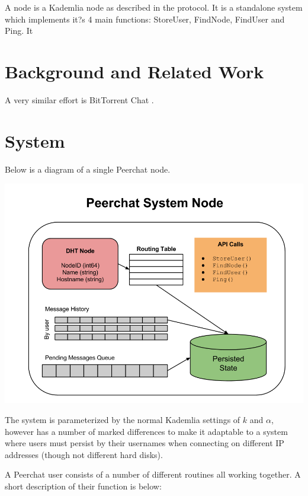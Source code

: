 \documentclass{article}
\begin{document}
A node is a Kademlia node as described in the protocol. It is a standalone system which implements it?s 4 main functions: StoreUser, FindNode, FindUser and Ping. It 

\section{Background and Related Work}

A very similar effort is BitTorrent Chat \cite{?}. 

\section{System}

Below is a diagram of a single Peerchat node. 

\includegraphics[scale=0.5]{peerchat}

The system is parameterized by the normal Kademlia settings of $k$ and $\alpha$, however has a number of marked differences to make it adaptable to a system where users must persist by their usernames when connecting on different IP addresses (though not different hard disks). 

A Peerchat user consists of a number of different routines all working together. A short description of their function is below:
\end{document}
